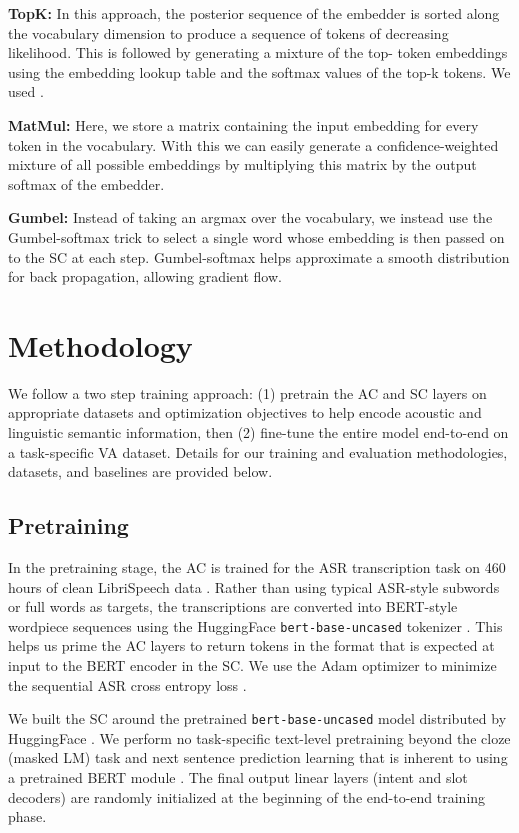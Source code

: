 \textbf{TopK:} In this approach, the posterior sequence of the embedder is sorted along the vocabulary dimension to produce a sequence of tokens of decreasing likelihood. This is followed by generating a mixture of the top- token embeddings using the embedding lookup table and the softmax values of the top-k tokens. We used .

\textbf{MatMul:} Here, we store a  matrix containing the input embedding for every token in the vocabulary. With this we can easily generate a confidence-weighted mixture of all possible embeddings by multiplying this matrix by the output softmax of the embedder.

\textbf{Gumbel:} Instead of taking an argmax over the vocabulary, we instead use the Gumbel-softmax trick \cite{gumbel} to select a single word whose embedding is then passed on to the SC at each step. Gumbel-softmax helps approximate a smooth distribution for back propagation, allowing gradient flow.

\section{Methodology}
We follow a two step training approach: (1) pretrain the AC and SC layers on appropriate datasets and optimization objectives to help encode acoustic and linguistic semantic information, then (2) fine-tune the entire model end-to-end on a task-specific VA dataset. Details for our training and evaluation methodologies, datasets, and baselines are provided below.

\subsection{Pretraining}
In the pretraining stage, the AC is trained for the ASR transcription task on  460 hours of clean LibriSpeech data \cite{panayotov2015librispeech}. Rather than using typical ASR-style subwords or full words as targets, the transcriptions are converted into BERT-style wordpiece sequences using the HuggingFace {\scriptsize\texttt{bert-base-uncased}} tokenizer \cite{wolf2020transformers}. This helps us prime the AC layers to return tokens in the format that is expected at input to the BERT encoder in the SC. We use the Adam optimizer to minimize the sequential ASR cross entropy loss .


We built the SC around the pretrained {\scriptsize\texttt{bert-base-uncased}} model distributed by HuggingFace \cite{wolf2020transformers}. We perform no task-specific text-level pretraining beyond the cloze (masked LM) task and next sentence prediction learning that is inherent to using a pretrained BERT module \cite{devlin2018bert}. The final output linear layers (intent and slot decoders) are randomly initialized at the beginning of the end-to-end training phase.

